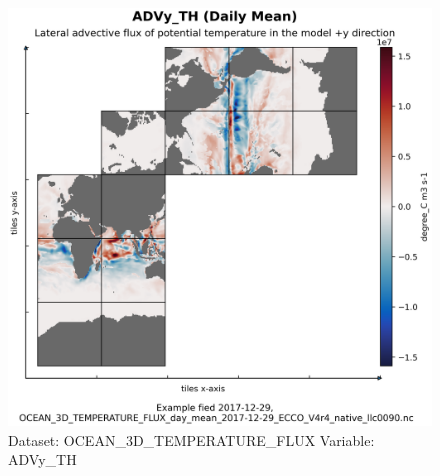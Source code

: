 \begin{figure}[H]
\centering
\includegraphics[width=\textwidth]{../images/plots/native_plots/Ocean_Three-Dimensional_Potential_Temperature_Fluxes/ADVy_TH.png}
\caption{Dataset: OCEAN\_3D\_TEMPERATURE\_FLUX Variable: ADVy\_TH}
\label{tab:table-OCEAN_3D_TEMPERATURE_FLUX_ADVy_TH-Plot}
\end{figure}
\pagebreak
